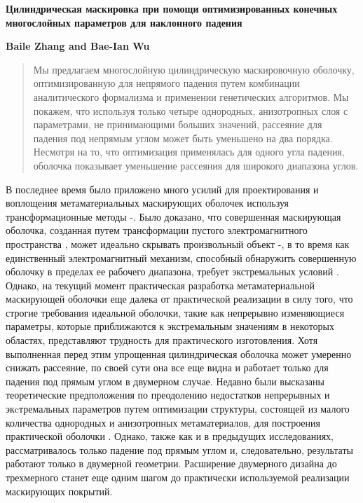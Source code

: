 \documentclass[a4paper, 12pt]{article}
\newcommand{\tit}[1]{\begin{center}{\bf{\Large #1}}\end{center}}
\newcommand{\aut}[1]{\centerline{{\bf #1}}}
\begin{document}
\sloppy
 \tit{Цилиндрическая маскировка при помощи оптимизированных конечных 
 многослойных параметров для наклонного падения}
 \aut{Baile Zhang and Bae-Ian Wu}

\begin{abstract}
Мы предлагаем многослойную цилиндрическую маскировочную оболочку, 
оптимизированную для непрямого падения путем комбинации аналитического 
формализма и применении генетических алгоритмов. 
Мы покажем, что используя только четыре однородных, анизотропных слоя с 
параметрами, не принимающими больших 
значений, рассеяние для падения под непрямым углом может быть уменьшено на 
два порядка. Несмотря на то, что оптимизация применялась для одного угла 
падения, оболочка показывает уменьшение рассеяния для широкого диапазона углов.
\end{abstract}

В последнее время было приложено много усилий для проектирования и воплощения 
метаматериальных маскирующих оболочек используя трансформационные методы 
\cite{1}-\cite{9}.
Было доказано, что совершенная маскирующая оболочка, созданная путем 
трансформации пустого электромагнитного пространства \cite{1}, может идеально 
скрывать произвольный объект \cite{5}-\cite{7}, в то время как единственный 
электромагнитный механизм, способный обнаружить
совершенную оболочку в пределах ее рабочего диапазона, требует экстремальных 
условий \cite{10}. Однако, на текущий момент практическая разработка 
метаматериальной маскирующей оболочки еще далека от практической реализации в 
силу того, что строгие требования идеальной оболочки, такие как непрерывно
изменяющиеся параметры, которые приближаются к экстремальным значениям в 
некоторых областях, представляют трудность для практического изготовления. 
Хотя выполненная перед этим упрощенная цилиндрическая оболочка \cite{3}
может умеренно снижать рассеяние, по своей сути она все еще видна \cite{11} и 
работает только для падения под прямым углом в двумерном случае. Недавно были 
высказаны теоретические предположения по преодолению недостатков
непрерывных и экcтремальных параметров путем оптимизации структуры, состоящей 
из малого количества однородных и анизотропных метаматериалов, для построения 
практической оболочки \cite{12, 13}. Однако, также как и в предыдущих 
исследованиях, рассматривалось только падение под прямым углом и, 
следовательно, результаты работают только в двумерной геометрии. Расширение 
двумерного дизайна до трехмерного станет еще одним шагом до практически 
используемой реализации маскирующих покрытий.
\end{document}
